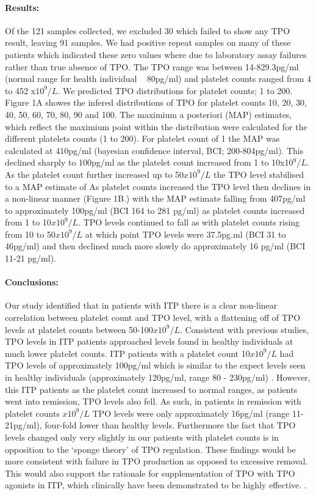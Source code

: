 \documentclass[11pt]{article}
\begin{document}
\paragraph{Results:} Of the 121 samples collected, we excluded 30 which failed to show any TPO result, leaving 91 samples. We had positive repeat samples on many of these patients which indicated these zero values where due to laboratory assay failures rather than true absence of TPO. The TPO range was between 14-829.3pg/ml (normal range for health individual ~ 80pg/ml) and platelet counts ranged from 4 to 452 x$10^9/L$.  We predicted TPO distributions for platelet counts; 1 to 200. Figure 1A showes the infered distributions of TPO for platelet counts 10, 20, 30, 40, 50, 60, 70, 80, 90 and 100. The maximium a posteriori (MAP) estimates, which reflect the maximium point within the distribution were calculated for the different platelets counts (1 to 200). For platelet count of 1 the MAP was calculated at 410pg/ml (bayesian confidence interval, BCI; 200-804pg/ml). This declined sharply to 100pg/ml as the platelet count increased from 1 to 10x10$^9/L$. As the platelet count further increased up to 50$x10^9/L$ the TPO level stabilised to a MAP estimate of  As platelet counts increased the TPO level then declines in a non-linear manner (Figure 1B.) with the MAP estimate falling from 407pg/ml to approximately 100pg/ml (BCI 164 to 281 pg/ml) as platelet counts increased from 1 to 10$x10^9/L$. TPO levels continued to fall as with platelet counts rising from 10 to 50$x10^9/L$ at which point TPO levels were 37.5pg.ml (BCI 31 to 46pg/ml) and then declined much more slowly do approximately 16 pg/ml (BCI 11-21 pg/ml).

\paragraph{Conclusions:} Our study identified that in patients with ITP there is a clear non-linear correlation between platelet count and TPO level, with a flattening off of TPO levels at platelet counts between 50-100$x10^9/L$. Consistent with previous studies, TPO levels in ITP patients approached levels found in healthy individuals at much lower platelet counts. ITP patients with a platelet count 10$x10^9/L$ had TPO levels of approximately 100pg/ml which is similar to the expect levels seen in healthy individuals (approximately 120pg/ml, range 80 - 230pg/ml) \cite{SinghCirculatingthrombopoietinlevels2015}. However, this ITP patients as the platelet count increased to normal ranges, as patients went into remission, TPO levels also fell. As such, in patients in remission with platelet counts $x10^9/L$ TPO levels were only approximately 16pg/ml (range 11-21pg/ml), four-fold lower than healthy levels. Furthermore the fact that TPO levels changed only very slightly in our patients with platelet counts  is in opposition to the `sponge theory' of TPO regulation. These findings would be more consistent with failure in TPO production as opposed to excessive removal. This would also support the rationale for supplementation of TPO with TPO agonists in ITP, which clinically have been demonstrated to be highly effective.  \cite{WangEfficacysafetythrombopoietin2016}.
\end{document}
